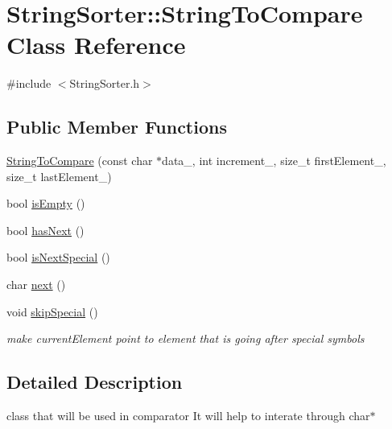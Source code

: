 \hypertarget{classStringSorter_1_1StringToCompare}{}\section{String\+Sorter\+:\+:String\+To\+Compare Class Reference}
\label{classStringSorter_1_1StringToCompare}


{\ttfamily \#include $<$String\+Sorter.\+h$>$}

\subsection*{Public Member Functions}
\begin{DoxyCompactItemize}
\item 
\hyperlink{classStringSorter_1_1StringToCompare_ae372b5cb1d2239eabfb3763ca320d582}{String\+To\+Compare} (const char $\ast$data\+\_\+, int increment\+\_\+, size\+\_\+t first\+Element\+\_\+, size\+\_\+t last\+Element\+\_\+)
\item 
bool \hyperlink{classStringSorter_1_1StringToCompare_a6bbaa86a9cea9bb61a9740431ddfcd50}{is\+Empty} ()
\item 
bool \hyperlink{classStringSorter_1_1StringToCompare_a60f405ee55a463629c87015d74691998}{has\+Next} ()
\item 
bool \hyperlink{classStringSorter_1_1StringToCompare_a28fb2f53c09c94445aa06c66cb102b7f}{is\+Next\+Special} ()
\item 
char \hyperlink{classStringSorter_1_1StringToCompare_af430553722c039a02c7373ca45162cca}{next} ()
\item 
\mbox{\label{classStringSorter_1_1StringToCompare_a51378e84e216d17ca2fb211b23047f7e}} 
void \hyperlink{classStringSorter_1_1StringToCompare_a51378e84e216d17ca2fb211b23047f7e}{skip\+Special} ()
\begin{DoxyCompactList}\small\item\em make current\+Element point to element that is going after special symbols \end{DoxyCompactList}\end{DoxyCompactItemize}


\subsection{Detailed Description}
class that will be used in comparator It will help to interate through char$\ast$ 

